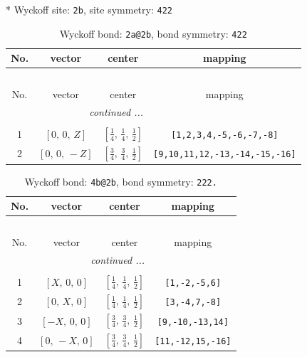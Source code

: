 \documentclass[fleqn,8pt]{jsarticle}
\begin{document}
* Wyckoff site: {\tt 2b}, site symmetry: {\tt 422}
\renewcommand{\arraystretch}{1.2}
\begin{longtable}{cccc}
\caption{Wyckoff bond: {\tt 2a@2b}, bond symmetry: {\tt 422}}
 \\
 \hline \hline
No. & vector & center & mapping \\ \hline \endfirsthead

\multicolumn{3}{l}{\tablename\ \thetable{}} \\
 \hline \hline
No. & vector & center & mapping \\ \hline \endhead

 \hline \hline
\multicolumn{3}{r}{\footnotesize\it continued ...} \\ \endfoot

 \hline \hline
\multicolumn{3}{r}{} \\ \endlastfoot

1 & $\left[ 0,\, 0,\, Z \right]$ & $\left[ \frac{1}{4},\, \frac{1}{4},\, \frac{1}{2} \right]$ & {\tt [1,2,3,4,-5,-6,-7,-8]} \\ \hline
2 & $\left[ 0,\, 0,\, - Z \right]$ & $\left[ \frac{3}{4},\, \frac{3}{4},\, \frac{1}{2} \right]$ & {\tt [9,10,11,12,-13,-14,-15,-16]} \\
\end{longtable}
\renewcommand{\arraystretch}{1.2}
\begin{longtable}{cccc}
\caption{Wyckoff bond: {\tt 4b@2b}, bond symmetry: {\tt 222.}}
 \\
 \hline \hline
No. & vector & center & mapping \\ \hline \endfirsthead

\multicolumn{3}{l}{\tablename\ \thetable{}} \\
 \hline \hline
No. & vector & center & mapping \\ \hline \endhead

 \hline \hline
\multicolumn{3}{r}{\footnotesize\it continued ...} \\ \endfoot

 \hline \hline
\multicolumn{3}{r}{} \\ \endlastfoot

1 & $\left[ X,\, 0,\, 0 \right]$ & $\left[ \frac{1}{4},\, \frac{1}{4},\, \frac{1}{2} \right]$ & {\tt [1,-2,-5,6]} \\ \hline
2 & $\left[ 0,\, X,\, 0 \right]$ & $\left[ \frac{1}{4},\, \frac{1}{4},\, \frac{1}{2} \right]$ & {\tt [3,-4,7,-8]} \\ \hline
3 & $\left[ - X,\, 0,\, 0 \right]$ & $\left[ \frac{3}{4},\, \frac{3}{4},\, \frac{1}{2} \right]$ & {\tt [9,-10,-13,14]} \\ \hline
4 & $\left[ 0,\, - X,\, 0 \right]$ & $\left[ \frac{3}{4},\, \frac{3}{4},\, \frac{1}{2} \right]$ & {\tt [11,-12,15,-16]} \\
\end{longtable}
\end{document}
